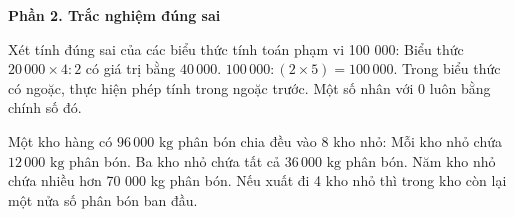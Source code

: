 \textbf{Phần 2. Trắc nghiệm đúng sai}

\begin{ex} %
Xét tính đúng sai của các biểu thức tính toán phạm vi 100 000:
\choiceTF
{\True Biểu thức $20\,000 \times 4 : 2$ có giá trị bằng $40\,000$.}
{$100\,000 : (2 \times 5) = 100\,000$.}
{\True Trong biểu thức có ngoặc, thực hiện phép tính trong ngoặc trước.}
{Một số nhân với 0 luôn bằng chính số đó.}
\end{ex}

\begin{ex} %
Một kho hàng có $96\,000\text{ kg}$ phân bón chia đều vào 8 kho nhỏ:
\choiceTF
{\True Mỗi kho nhỏ chứa $12\,000\text{ kg}$ phân bón.}
{\True Ba kho nhỏ chứa tất cả $36\,000\text{ kg}$ phân bón.}
{Năm kho nhỏ chứa nhiều hơn 70 000 kg phân bón.}
{\True Nếu xuất đi 4 kho nhỏ thì trong kho còn lại một nửa số phân bón ban đầu.}
\end{ex}

